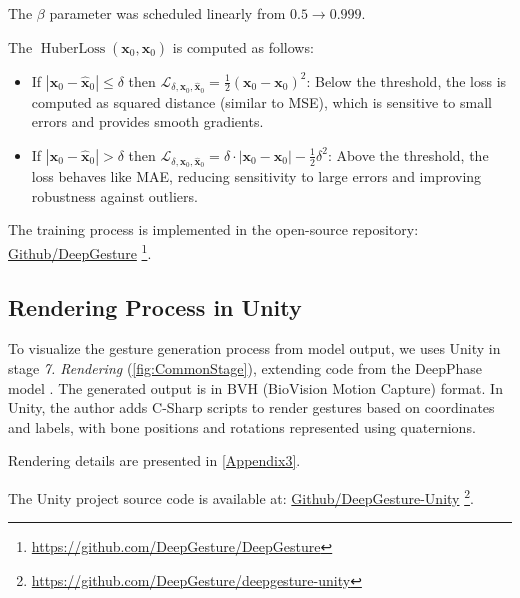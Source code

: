 The $\beta$ parameter was scheduled linearly from $0.5 \rightarrow 0.999$.

The $\operatorname{HuberLoss} (\mathbf{x}_{0},  \hat{\mathbf{x}}_{0} )$ is computed as follows:

\begin{itemize}
	\item If $|\mathbf{x}_0 - \hat{\mathbf{x}}_0| \leq \delta$ then $\mathcal{L}_{ \delta, \mathbf{x}_0, \hat{\mathbf{x}}_0} = \frac{1}{2} (\mathbf{x}_0 - \mathbf{x}_0)^2$: Below the threshold, the loss is computed as squared distance (similar to MSE), which is sensitive to small errors and provides smooth gradients.
	
	\item If $|\mathbf{x}_0 - \hat{\mathbf{x}}_0| > \delta$ then $\mathcal{L}_{ \delta, \mathbf{x}_0, \hat{\mathbf{x}}_0}  =  \delta \cdot |\mathbf{x}_0 - \mathbf{x}_0| - \frac{1}{2} \delta^2$: Above the threshold, the loss behaves like MAE, reducing sensitivity to large errors and improving robustness against outliers.
	
\end{itemize}

The training process is implemented in the open-source repository: \hyperlink{https://github.com/DeepGesture/DeepGesture}{Github/DeepGesture} \footnote{\url{https://github.com/DeepGesture/DeepGesture}}.

\subsection{Rendering Process in Unity}
\label{sec:Render}

To visualize the gesture generation process from model output, we uses Unity in stage \textit{7. Rendering} (\autoref{fig:CommonStage}), extending code from the DeepPhase model \cite{starke2022deepphase}. The generated output is in BVH (BioVision Motion Capture) format. In Unity, the author adds C-Sharp scripts to render gestures based on coordinates and labels, with bone positions and rotations represented using quaternions.

Rendering details are presented in \autoref{Appendix3}.

The Unity project source code is available at: \hyperlink{https://github.com/DeepGesture/deepgesture-unity}{Github/DeepGesture-Unity}
\footnote{\url{https://github.com/DeepGesture/deepgesture-unity}}.










